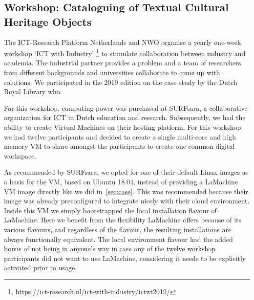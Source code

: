\documentclass[a4paper,11pt]{article}
\begin{document}

\subsection{Workshop: Cataloguing of Textual Cultural Heritage Objects}
\label{sec:case2}

The ICT-Research Platform Netherlands and NWO organise a yearly one-week workshop `ICT with Industry'
\footnote{https://ict-research.nl/ict-with-industry/ictwi2019/} to stimulate collaboration between industry and
academia. The industrial partner provides a problem and a team of researchers from different backgrounds and
universities collaborate to come up with solutions. We participated in the 2019 edition on the case study by the Dutch
Royal Library who %

For this workshop, computing power was purchased at SURFsara, a collaborative organization for ICT in Dutch education
and research. Subsequently, we had the ability to create Virtual Machines on their hosting platform. For this workshop
we had twelve participants and decided to create a single multi-core and high memory VM to share amongst the
participants to create one common digital workspace.

As recommended by SURFsara, we opted for one of their default Linux images as a basis for the VM, based on Ubuntu 18.04,
instead of providing a LaMachine VM image directly like we did in~\ref{sec:case}. This was recommended because their image
was already preconfigured to integrate nicely with their cloud environment. Inside this VM we simply bootstrapped the local
installation flavour of LaMachine.  Here we benefit from the flexibility LaMachine offers because of its various
flavours, and regardless of the flavour, the resulting installations are always functionally equivalent. The local
environment flavour had the added bonus of not being in anyone's way in case any of the twelve workshop participants did
not want to use LaMachine, considering it needs to be explicitly activated prior to usage.
\end{document}
